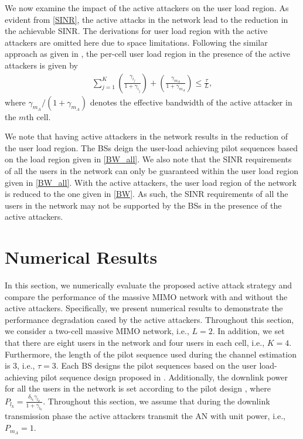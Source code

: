 \documentclass[conference]{IEEEtran}
\begin{document}
We now examine the impact of the active attackers on the user load region. As evident from \eqref{SINR}, the active attacks in the network lead to the reduction in the achievable SINR. The derivations for user load region with the active attackers are omitted here due to space limitations.  Following the similar approach as given in \cite{Akbar16,Akbar16a}, the per-cell user load region in the presence of the active attackers is given by
\begin{align}\label{BW}
\sum_{j=1}^{K}\left(\frac{\gamma_{i_{j}}}{1+\gamma_{i_{j}}}\right) + \left(\frac{\gamma_{m_{A}}}{1+\gamma_{m_{A}}}\right) \leq\frac{\tau}{L}, \tag{14}
\end{align}
where ${\gamma_{m_{A}}}/({1+\gamma_{m_{A}}})$ denotes the effective bandwidth of the active attacker in the $m$th cell.

We note that having active attackers in the network results in the reduction of the user load region. The BSs deign the user-load achieving pilot sequences based on the load region given in \eqref{BW_all}. We also note that the SINR requirements of all the users in the network can only be guaranteed within the user load region given in \eqref{BW_all}. With the active attackers, the user load region of the network is reduced to the one given in \eqref{BW}. As such, the SINR requirements of all the users in the network may not be supported by the BSs in the presence of the active attackers.


\section{Numerical Results}\label{sec:Numerical}

In this section, we numerically evaluate the proposed active attack strategy and compare the performance of the massive MIMO network with and without the active attackers. Specifically, we present numerical results to demonstrate the  performance degradation cased by the active attackers. Throughout this section, we consider a two-cell massive MIMO network, i.e., $L=2$. In addition, we set that there are eight users in the network and four users in each cell, i.e., $K=4$. Furthermore, the length of the pilot sequence used during the channel estimation is $3$, i.e., $\tau=3$. Each BS designs the pilot sequences based on the user load-achieving pilot sequence design proposed in \cite{Akbar16,Akbar16a}. Additionally, the downlink power for all the users in the network is set according to the pilot design \cite{Akbar16,Akbar16a}, where $P_{l_{k}}=\frac{\delta_{l_{k}}\gamma_{l_{k}}}{1+\gamma_{l_{k}}}$. Throughout this section, we assume that during the downlink transmission phase the active attackers transmit the AN with unit power, i.e., $P_{m_A}=1$.
\end{document}
